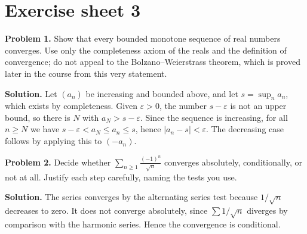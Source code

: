 \documentclass[11pt]{article}
\begin{document}
\section*{Exercise sheet 3}
\textbf{Problem 1.} Show that every bounded monotone sequence of real numbers converges. Use only
the completeness axiom of the reals and the definition of convergence; do not appeal to the
Bolzano--Weierstrass theorem, which is proved later in the course from this very statement.

\textbf{Solution.} Let $(a_n)$ be increasing and bounded above, and let $s = \sup_n a_n$, which
exists by completeness. Given $\varepsilon > 0$, the number $s - \varepsilon$ is not an upper
bound, so there is $N$ with $a_N > s - \varepsilon$. Since the sequence is increasing, for all
$n \ge N$ we have $s - \varepsilon < a_N \le a_n \le s$, hence $|a_n - s| < \varepsilon$. The
decreasing case follows by applying this to $(-a_n)$.

\textbf{Problem 2.} Decide whether $\sum_{n\ge 1} \frac{(-1)^n}{\sqrt n}$ converges absolutely,
conditionally, or not at all. Justify each step carefully, naming the tests you use.

\textbf{Solution.} The series converges by the alternating series test because $1/\sqrt n$
decreases to zero. It does not converge absolutely, since $\sum 1/\sqrt n$ diverges by
comparison with the harmonic series. Hence the convergence is conditional.
\end{document}
